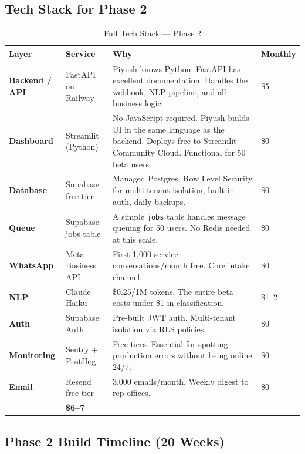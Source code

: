 \documentclass[12pt, a4paper]{article}
\begin{document}
\subsection{Tech Stack for Phase 2}

\begin{table}[ht]
\centering
\caption{Full Tech Stack --- Phase 2}
\renewcommand{\arraystretch}{1.5}
\begin{tabularx}{\textwidth}{>{\bfseries}p{2.2cm} p{3.5cm} X p{1.8cm}}
\toprule
\rowcolor{pollitylightblue}
\textbf{Layer} & \textbf{Service} & \textbf{Why} & \textbf{Monthly} \\
\midrule
Backend / API  & FastAPI on Railway     & Piyush knows Python. FastAPI has excellent documentation. Handles the webhook, NLP pipeline, and all business logic. & \$5 \\
Dashboard      & Streamlit (Python)     & No JavaScript required. Piyush builds UI in the same language as the backend. Deploys free to Streamlit Community Cloud. Functional for 50 beta users. & \$0 \\
Database       & Supabase free tier     & Managed Postgres, Row Level Security for multi-tenant isolation, built-in auth, daily backups. & \$0 \\
Queue          & Supabase jobs table    & A simple \texttt{jobs} table handles message queuing for 50 users. No Redis needed at this scale. & \$0 \\
WhatsApp       & Meta Business API      & First 1,000 service conversations/month free. Core intake channel. & \$0 \\
NLP            & Claude Haiku           & \$0.25/1M tokens. The entire beta costs under \$1 in classification. & \$1--2 \\
Auth           & Supabase Auth          & Pre-built JWT auth. Multi-tenant isolation via RLS policies. & \$0 \\
Monitoring     & Sentry + PostHog       & Free tiers. Essential for spotting production errors without being online 24/7. & \$0 \\
Email          & Resend free tier       & 3,000 emails/month. Weekly digest to rep offices. & \$0 \\
\midrule
\rowcolor{lightgreen}
\multicolumn{3}{l}{\textbf{Monthly total}} & \textbf{\$6--7} \\
\bottomrule
\end{tabularx}
\end{table}

\subsection{Phase 2 Build Timeline (20 Weeks)}
\end{document}
